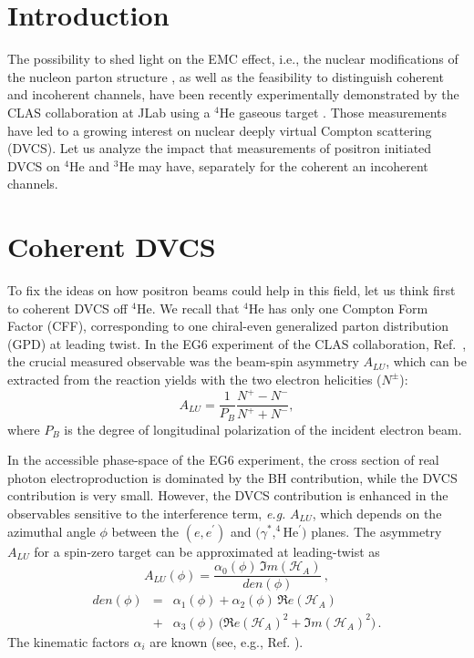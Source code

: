 \documentclass[times, twoside]{PosWhiPap}
\begin{document}
\section*{Introduction}
{
The possibility to shed light on the EMC effect, i.e., the nuclear 
   modifications of the nucleon parton structure \cite{Dupre:2015jha, 
   Cloet:2019mql}, as well as the feasibility to distinguish coherent and 
   incoherent channels, have been recently experimentally demonstrated by the 
   CLAS collaboration at JLab using a $^4$He gaseous target
     \cite{Hattawy:2017woc, Hattawy:2018liu}. Those measurements have led to a 
     growing interest on nuclear deeply virtual Compton scattering (DVCS). Let 
     us analyze the impact that measurements of positron initiated DVCS on 
     $^4$He and $^3$He may have, separately for the coherent an incoherent 
     channels}.

\section*{Coherent DVCS}
To fix the ideas on how positron beams could help in this field, 
let us think first to coherent DVCS off $^4$He.
We recall that $^4$He has only one Compton Form Factor (CFF), corresponding to 
   one chiral-even generalized parton distribution (GPD) at leading twist. In 
   the EG6 experiment of the CLAS collaboration, Ref.~\cite{Hattawy:2017woc},
   the crucial measured observable was the beam-spin asymmetry $A_{LU}$, which 
   can be extracted from the reaction yields with the two electron helicities 
   ($N^{\pm}$):
\begin{equation}
A_{LU} = \frac{1}{P_{B}} \frac{N^{+} - N^{-}}{N^{+} + N^{-} },
\end{equation}
where $P_{B}$ is the degree of longitudinal polarization of the incident 
electron beam.
 
   In the accessible phase-space of the EG6 experiment, the cross section of 
   real photon electroproduction is dominated by the BH contribution, while the 
   DVCS contribution is very small.  However, the DVCS contribution is enhanced 
   in the observables sensitive to the interference term, {\it e.g.} $A_{LU}$, 
   which depends on the azimuthal angle $\phi$ between the $(e,e^\prime)$ and 
   $(\gamma^*,^4$He$^\prime)$ planes. The asymmetry $A_{LU}$ for a spin-zero 
   target can be approximated at leading-twist as
\begin{equation}
A_{LU}(\phi) = 
\frac{\alpha_{0}(\phi) \, \Im m(\mathcal{H}_{A})} 
{den(\phi)} \, ,
\end{equation}
\begin{eqnarray}
den(\phi) & = & 
\alpha_{1}(\phi) + \alpha_{2}(\phi) \, \Re e(\mathcal{H}_{A}) 
\nonumber
\\
& + & \alpha_{3}(\phi) \, 
\big( \Re e(\mathcal{H}_{A})^{2} + \Im m(\mathcal{H}_{A})^{2} \big)\, .
\label{boh}
\end{eqnarray}
The kinematic factors $\alpha_i$ are known (see, e.g., Ref.  
\cite{Belitsky:2001ns,Belitsky:2008bz}). 
\end{document}
